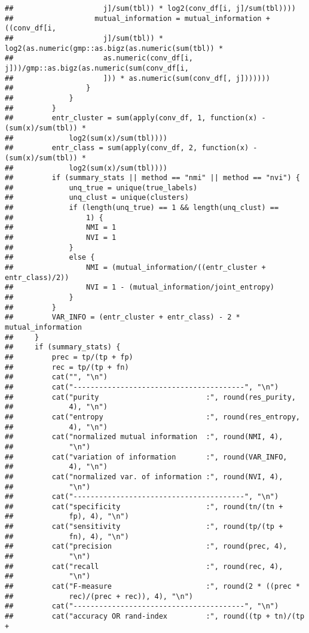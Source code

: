 \documentclass[
]{article}
\begin{document}
\begin{verbatim}
##                     j]/sum(tbl)) * log2(conv_df[i, j]/sum(tbl))))
##                   mutual_information = mutual_information + ((conv_df[i, 
##                     j]/sum(tbl)) * log2(as.numeric(gmp::as.bigz(as.numeric(sum(tbl)) * 
##                     as.numeric(conv_df[i, j]))/gmp::as.bigz(as.numeric(sum(conv_df[i, 
##                     ])) * as.numeric(sum(conv_df[, j]))))))
##                 }
##             }
##         }
##         entr_cluster = sum(apply(conv_df, 1, function(x) -(sum(x)/sum(tbl)) * 
##             log2(sum(x)/sum(tbl))))
##         entr_class = sum(apply(conv_df, 2, function(x) -(sum(x)/sum(tbl)) * 
##             log2(sum(x)/sum(tbl))))
##         if (summary_stats || method == "nmi" || method == "nvi") {
##             unq_true = unique(true_labels)
##             unq_clust = unique(clusters)
##             if (length(unq_true) == 1 && length(unq_clust) == 
##                 1) {
##                 NMI = 1
##                 NVI = 1
##             }
##             else {
##                 NMI = (mutual_information/((entr_cluster + entr_class)/2))
##                 NVI = 1 - (mutual_information/joint_entropy)
##             }
##         }
##         VAR_INFO = (entr_cluster + entr_class) - 2 * mutual_information
##     }
##     if (summary_stats) {
##         prec = tp/(tp + fp)
##         rec = tp/(tp + fn)
##         cat("", "\n")
##         cat("----------------------------------------", "\n")
##         cat("purity                         :", round(res_purity, 
##             4), "\n")
##         cat("entropy                        :", round(res_entropy, 
##             4), "\n")
##         cat("normalized mutual information  :", round(NMI, 4), 
##             "\n")
##         cat("variation of information       :", round(VAR_INFO, 
##             4), "\n")
##         cat("normalized var. of information :", round(NVI, 4), 
##             "\n")
##         cat("----------------------------------------", "\n")
##         cat("specificity                    :", round(tn/(tn + 
##             fp), 4), "\n")
##         cat("sensitivity                    :", round(tp/(tp + 
##             fn), 4), "\n")
##         cat("precision                      :", round(prec, 4), 
##             "\n")
##         cat("recall                         :", round(rec, 4), 
##             "\n")
##         cat("F-measure                      :", round(2 * ((prec * 
##             rec)/(prec + rec)), 4), "\n")
##         cat("----------------------------------------", "\n")
##         cat("accuracy OR rand-index         :", round((tp + tn)/(tp + 

\end{verbatim}
\end{document}
